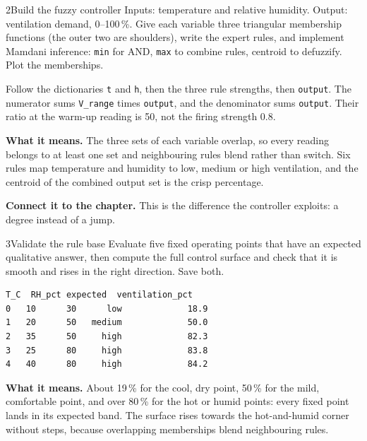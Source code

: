 \begin{labquestion}{2}{Build the fuzzy controller}
Inputs: temperature and relative humidity. Output: ventilation demand, 0--100\,\%. Give each variable three triangular membership functions (the outer two are shoulders), write the expert rules, and implement Mamdani inference: \texttt{min} for AND, \texttt{max} to combine rules, centroid to defuzzify. Plot the memberships.
\end{labquestion}
\begin{labanswer}
Follow the dictionaries \texttt{t} and \texttt{h}, then the three rule strengths, then \texttt{output}. The numerator sums \texttt{V\_range} times \texttt{output}, and the denominator sums \texttt{output}. Their ratio at the warm-up reading is 50, not the firing strength 0.8.




\textbf{What it means.} The three sets of each variable overlap, so every reading belongs to at least one set and neighbouring rules blend rather than switch. Six rules map temperature and humidity to low, medium or high ventilation, and the centroid of the combined output set is the crisp percentage.
\end{labanswer}

\textbf{Connect it to the chapter.} This is the difference the controller exploits: a degree instead of a jump.


\begin{labquestion}{3}{Validate the rule base}
Evaluate five fixed operating points that have an expected qualitative answer, then compute the full control surface and check that it is smooth and rises in the right direction. Save both.
\end{labquestion}
\begin{labanswer}

\begin{refoutput}
\begin{lstlisting}[style=utpterminal]
   T_C  RH_pct expected  ventilation_pct
0   10      30      low             18.9
1   20      50   medium             50.0
2   35      50     high             82.3
3   25      80     high             83.8
4   40      80     high             84.2
\end{lstlisting}
\end{refoutput}

\textbf{What it means.} About 19\,\% for the cool, dry point, 50\,\% for the mild, comfortable point, and over 80\,\% for the hot or humid points: every fixed point lands in its expected band. The surface rises towards the hot-and-humid corner without steps, because overlapping memberships blend neighbouring rules.
\end{labanswer}

